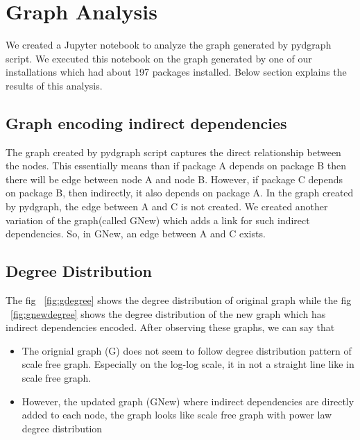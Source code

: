 \section{Graph Analysis} \label{graphanalysis}
We created a Jupyter notebook to analyze the graph generated by pydgraph
script. We executed this notebook on the graph generated by one of our
installations which had about 197 packages installed. Below section
explains the results of this analysis.

\subsection{Graph encoding indirect dependencies} \label{graphvariation}
The graph created by pydgraph script captures the direct relationship between
the nodes. This essentially means than if package A depends on package B then
 there will be edge between node A and node B. However, if package C depends
 on package B, then indirectly, it also depends on package A. In the graph
 created by pydgraph, the edge between A and C is not created.
 We created another variation of the graph(called GNew) which adds a link for
  such indirect dependencies. So, in GNew, an edge between A and C exists.

\subsection{Degree Distribution} \label{degreedist}
The fig ~\ref{fig:gdegree} shows the degree distribution of original graph while
the fig ~\ref{fig:gnewdegree}  shows the degree distribution of the new graph
which has
indirect dependencies encoded.
After observing these graphs, we can say that
 \begin{itemize}
 \item The orignial graph (G) does not seem to follow degree distribution
 pattern of scale free graph. Especially on the log-log scale, it in not a
 straight line like in scale free graph.
 \item However, the updated graph (GNew) where indirect dependencies are
 directly added to each node, the graph looks like scale free graph with
 power law degree distribution
\end{itemize}


